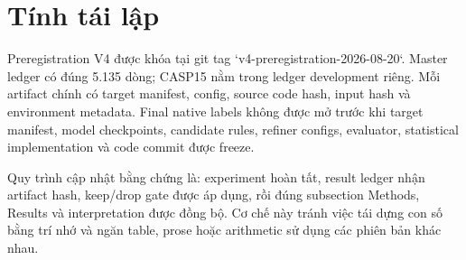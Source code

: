 \documentclass[12pt,a4paper,oneside]{report}
\begin{document}
\chapter{Tính tái lập}

Preregistration V4 được khóa tại git tag `v4-preregistration-2026-08-20`. Master ledger
có đúng 5.135 dòng; CASP15 nằm trong ledger development riêng. Mỗi artifact chính có
target manifest, config, source code hash, input hash và environment metadata. Final
native labels không được mở trước khi target manifest, model checkpoints, candidate
rules, refiner configs, evaluator, statistical implementation và code commit được
freeze.

Quy trình cập nhật bằng chứng là: experiment hoàn tất, result ledger nhận artifact
hash, keep/drop gate được áp dụng, rồi đúng subsection Methods, Results và interpretation
được đồng bộ. Cơ chế này tránh việc tái dựng con số bằng trí nhớ và ngăn table, prose
hoặc arithmetic sử dụng các phiên bản khác nhau.


\end{document}
